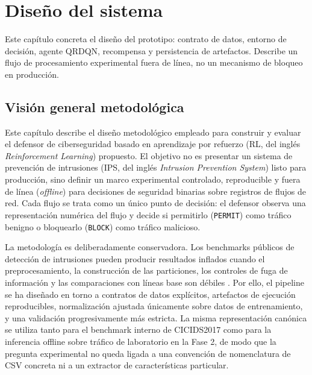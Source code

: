 \chapter{Diseño del sistema}
\label{cap:diseno-sistema}

Este capítulo concreta el diseño del prototipo: contrato de datos, entorno de decisión, agente QRDQN, recompensa y persistencia de artefactos. Describe un flujo de procesamiento experimental fuera de línea, no un mecanismo de bloqueo en producción.

\section{Visión general metodológica}
Este capítulo describe el diseño metodológico empleado para construir y evaluar el defensor de ciberseguridad basado en aprendizaje por refuerzo (RL, del inglés \emph{Reinforcement Learning}) propuesto. El objetivo no es presentar un sistema de prevención de intrusiones (IPS, del inglés \emph{Intrusion Prevention System}) listo para producción, sino definir un marco experimental controlado, reproducible y fuera de línea (\emph{offline}) para decisiones de seguridad binarias sobre registros de flujos de red. Cada flujo se trata como un único punto de decisión: el defensor observa una representación numérica del flujo y decide si permitirlo (\texttt{PERMIT}) como tráfico benigno o bloquearlo (\texttt{BLOCK}) como tráfico malicioso.

La metodología es deliberadamente conservadora. Los benchmarks públicos de detección de intrusiones pueden producir resultados inflados cuando el preprocesamiento, la construcción de las particiones, los controles de fuga de información y las comparaciones con líneas base son débiles \parencite{Arp2020DosDontsMLSecurity,Engelen2021CICIDSIssues,Lanvin2023Errors}. Por ello, el pipeline se ha diseñado en torno a contratos de datos explícitos, artefactos de ejecución reproducibles, normalización ajustada únicamente sobre datos de entrenamiento, y una validación progresivamente más estricta. La misma representación canónica se utiliza tanto para el benchmark interno de CICIDS2017 como para la inferencia offline sobre tráfico de laboratorio en la Fase 2, de modo que la pregunta experimental no queda ligada a una convención de nomenclatura de CSV concreta ni a un extractor de características particular.

